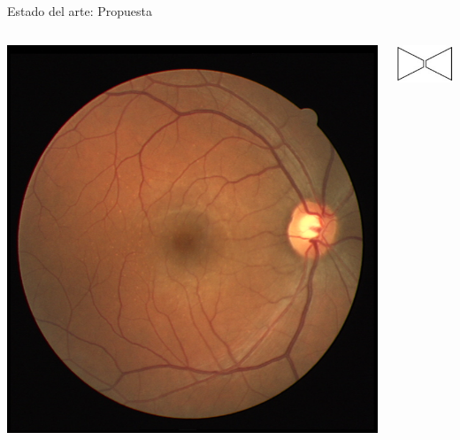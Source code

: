 \documentclass[xcolor=dvipsnames,table]{beamer}
\begin{document}
\begin{frame}{Estado del arte: Propuesta}
\begin{columns}[c]
		\vfill
		\vspace{-0.3cm} %
		\begin{columns}[c]
			\begin{center}
				\hspace*{0.4cm}
				\includegraphics[width=\linewidth]{my_images/ML/36_training.jpg}
			\end{center}
			\begin{center}
				\hspace*{0.4cm}
				\includegraphics[width=\linewidth]{my_images/curvasROC/red.png}

\end{center}
\end{columns}
\end{columns}
\end{frame}
\end{document}
